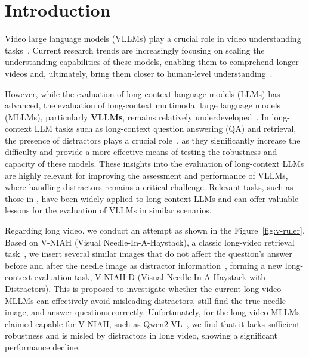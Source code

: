 \section{Introduction}

Video large language models (VLLMs) play a crucial role in video understanding tasks~\cite{2023videochat,lin2023video,chen2024sharegpt4video,maaz2024videochatgptdetailedvideounderstanding}. Current research trends are increasingly focusing on scaling the understanding capabilities of these models, enabling them to comprehend longer videos and, ultimately, bring them closer to human-level understanding~\cite{zhang2024longva,wang2024longllavascalingmultimodalllms,chen2024longvilascalinglongcontextvisual,internlmxcomposer2_5_OL}.

However, while the evaluation of long-context language models (LLMs) has advanced, the evaluation of long-context multimodal large language models (MLLMs), particularly \textbf{VLLMs}, remains relatively underdeveloped~\cite{zhang2024longva}. In long-context LLM tasks such as long-context question answering (QA) and retrieval, the presence of distractors plays a crucial role~\cite{hsieh2024ruler,yuan2024lv}, as they significantly increase the difficulty and provide a more effective means of testing the robustness and capacity of these models. These insights into the evaluation of long-context LLMs are highly relevant for improving the assessment and performance of VLLMs, where handling distractors remains a critical challenge. Relevant tasks, such as those in \cite{yang2024qwen2,yang2024qwen25,InternLM3,team2024jamba}, have been widely applied to long-context LLMs and can offer valuable lessons for the evaluation of VLLMs in similar scenarios.

Regarding long video, we conduct an attempt as shown in the Figure~\ref{fig:v-ruler}. Based on V-NIAH (Visual Needle-In-A-Haystack), a classic long-video retrieval task~\cite{zhang2024longva}, we insert several similar images that do not affect the question's answer before and after the needle image as distractor information~\citep{hsieh2024ruler,yuan2024lv}, forming a new long-context evaluation task, V-NIAH-D (Visual Needle-In-A-Haystack with Distractors). This is proposed to investigate whether the current long-video MLLMs can effectively avoid misleading distractors, still find the true needle image, and answer questions correctly. Unfortunately, for the long-video MLLMs claimed capable for V-NIAH, such as Qwen2-VL~\cite{wang2024qwen2}, we find that it lacks sufficient robustness and is misled by distractors in long video, showing a significant performance decline.

